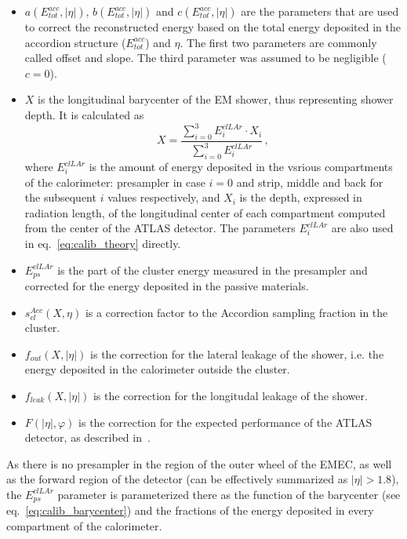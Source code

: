\begin{itemize}
\item $a(E^{acc}_{tot}, |\eta|)$, $b (E^{acc}_{tot}, |\eta|)$ and $c (E^{acc}_{tot}, |\eta|)$ are the parameters that are used to correct the reconstructed energy based on the total energy deposited in the accordion structure ($E^{acc}_{tot}$) and $\eta$. The first two parameters are commonly called offset and slope. The third parameter was assumed to be negligible ($c=0$).
\item $X$ is the longitudinal barycenter of the EM shower, thus representing shower depth. It is calculated as
\begin{equation}
\label{eq:calib_barycenter}
X = \frac{\sum\limits^{3}_{i=0}E^{clLAr}_{i} \cdot X_{i}}{\sum\limits^{3}_{i=0}E^{clLAr}_{i}} \,,
\end{equation}
where $E^{clLAr}_{i}$ is the amount of energy deposited in the vsrious compartments of the calorimeter: presampler in case $i=0$ and strip, middle and back for the subsequent $i$ values respectively, and $X_{i}$ is the depth, expressed in radiation length, of the longitudinal center of each compartment computed from the center of the ATLAS detector. The parameters $E^{clLAr}_{i}$ are also used in eq.~\ref{eq:calib_theory} directly.
\item $E^{clLAr}_{ps}$ is the part of the cluster energy measured in the presampler and corrected for the energy deposited in the passive materials.
\item $s^{Acc}_{cl}(X,\eta)$ is a correction factor to the Accordion sampling fraction in the cluster.
\item $f_{out}(X,|\eta|)$ is the correction for the lateral leakage of the shower, i.e. the energy deposited in the calorimeter outside the cluster.
\item $f_{leak}(X,|\eta|)$ is the correction for the longitudal leakage of the shower.
\item $F(|\eta|,\varphi)$ is the correction for the expected performance of the ATLAS detector, as described in~\cite{lib:ATLAS_perf}.
\end{itemize}

As there is no presampler in the region of the outer wheel of the EMEC, as well as the forward region of the detector (can be effectively summarized as $|\eta|>1.8$), the $E^{clLAr}_{ps}$ parameter is parameterized there as the function of the barycenter (see eq.~\ref{eq:calib_barycenter}) and the fractions of the energy deposited in every compartment of the calorimeter.


